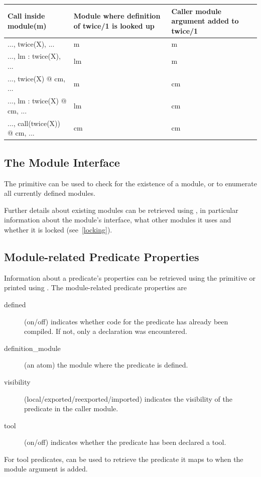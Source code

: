 \begin{tabular}{|p{5cm}|p{4cm}|p{4cm}|}
\hline
Call inside module(m)	& Module where definition of twice/1 is looked up
	    & Caller module argument added to twice/1 \\
\hline
..., twice(X), ...		&  m &  m \\
..., lm : twice(X), ...		& lm &  m \\
..., twice(X) @ cm, ...		&  m & cm \\
..., lm : twice(X) @ cm, ...	& lm & cm \\
..., call(twice(X)) @ cm, ...	& cm & cm \\
\hline
\end{tabular}


\subsection{The Module Interface}
The primitive 
can be used to check for the existence of a module, or to enumerate
all currently defined modules.

Further details about existing modules can be retrieved using
,
in particular information about the module's interface, what other
modules it uses and whether it is locked (see~\ref{locking}).


\subsection{Module-related Predicate Properties}
Information about a predicate's properties can be retrieved using the 
 primitive
or printed using .
The module-related predicate properties are
\begin{description}
\item[defined]
	(on/off) indicates whether code for the predicate has already
	been compiled. If not, only a declaration was encountered.
\item[definition_module]
	(an atom) the module where the predicate is defined.
\item[visibility]
	(local/exported/reexported/imported) indicates the visibility
	of the predicate in the caller module.
\item[tool]
	(on/off) indicates whether the predicate has been declared a tool.
\end{description}
For tool predicates, 
can be used to retrieve the predicate it maps to when the module
argument is added.

